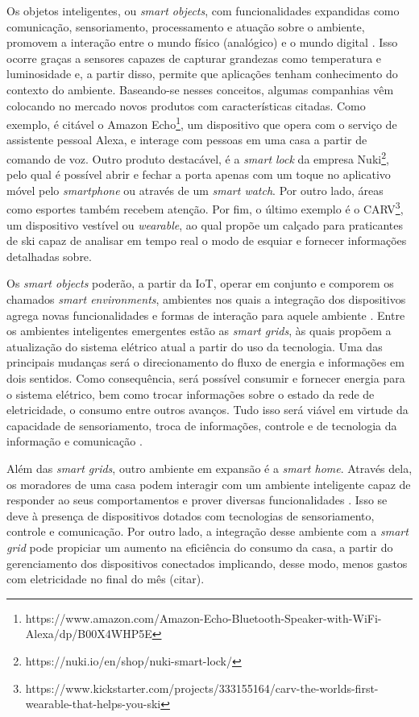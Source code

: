 Os objetos inteligentes, ou \textit{smart objects}, com funcionalidades expandidas como comunicação, sensoriamento, processamento e atuação sobre o ambiente, promovem a interação entre o mundo físico (analógico) e o mundo digital \cite{Stojkoska2017}. Isso ocorre graças a sensores capazes de capturar grandezas como temperatura e luminosidade e, a partir disso, permite que aplicações tenham conhecimento do contexto do ambiente. Baseando-se nesses conceitos, algumas companhias vêm colocando no mercado novos produtos com características citadas. Como exemplo, é citável o Amazon Echo\textsuperscript{\textregistered}\footnote{https://www.amazon.com/Amazon-Echo-Bluetooth-Speaker-with-WiFi-Alexa/dp/B00X4WHP5E}, um dispositivo que opera com o serviço de assistente pessoal Alexa, e interage com pessoas em uma casa a partir de comando de voz. Outro produto destacável, é a \textit{smart lock} da empresa Nuki\textsuperscript{\textregistered}\footnote{https://nuki.io/en/shop/nuki-smart-lock/}, pelo qual é possível abrir e fechar a porta apenas com um toque no aplicativo móvel pelo \textit{smartphone} ou através de um \textit{smart watch}. Por outro lado, áreas como esportes também recebem atenção. Por fim, o último exemplo é o CARV\textsuperscript{\textregistered}\footnote{https://www.kickstarter.com/projects/333155164/carv-the-worlds-first-wearable-that-helps-you-ski}, um dispositivo vestível ou \textit{wearable}, ao qual propõe um calçado para praticantes de ski capaz de analisar em tempo real o modo de esquiar e fornecer informações detalhadas sobre.

Os \textit{smart objects} poderão, a partir da IoT, operar em conjunto e comporem os chamados \textit{smart environments}, ambientes nos quais a integração dos dispositivos agrega novas funcionalidades e formas de interação para aquele ambiente \cite{Asano2016}. Entre os ambientes inteligentes emergentes estão as \textit{smart grids}, às quais propõem a atualização do sistema elétrico atual a partir do uso da tecnologia. Uma das principais mudanças será o direcionamento do fluxo de energia e informações em dois sentidos. Como consequência, será possível consumir e fornecer energia para o sistema elétrico, bem como trocar informações sobre o estado da rede de eletricidade, o consumo entre outros avanços. Tudo isso será viável em virtude da capacidade de sensoriamento, troca de informações, controle e de tecnologia da informação e comunicação \cite{Cecilia2016}.  

Além das \textit{smart grids}, outro ambiente em expansão é a \textit{smart home}. Através dela, os moradores de uma casa podem interagir com um ambiente inteligente capaz de responder ao seus comportamentos e prover diversas funcionalidades \cite{DeSilva2012}. Isso se deve à presença de dispositivos dotados com tecnologias de sensoriamento, controle e comunicação. Por outro lado, a integração desse ambiente com a \textit{smart grid} pode propiciar um aumento na eficiência do consumo da casa, a partir do gerenciamento dos dispositivos conectados implicando, desse modo, menos gastos com eletricidade no final do mês (citar). %

